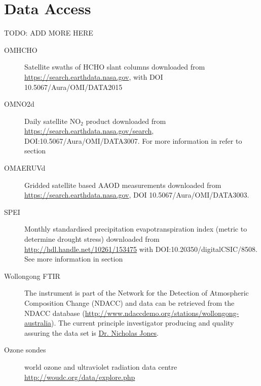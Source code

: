 \section{Data Access}
TODO: ADD MORE HERE
\label{Model:DataAccess}
\begin{description}
  \item[OMHCHO] Satellite swaths of HCHO slant columns downloaded from \url{https://search.earthdata.nasa.gov}, with DOI 10.5067/Aura/OMI/DATA2015
  
  \item[OMNO2d] Daily satellite NO$_2$ product downloaded from \url{https://search.earthdata.nasa.gov/search}, DOI:10.5067/Aura/OMI/DATA3007. 
  For more information in refer to section %
  
  \item[OMAERUVd] Gridded satellite based AAOD measurements downloaded from \url{https://search.earthdata.nasa.gov}, DOI 10.5067/Aura/OMI/DATA3003. %
  
  \item[SPEI] Monthly standardised precipitation evapotranspiration index (metric to determine drought stress) downloaded from \url{http://hdl.handle.net/10261/153475} with DOI:10.20350/digitalCSIC/8508.
  See more information in section %
  
  \item[Wollongong FTIR] The instrument is part of the Network for the Detection of Atmospheric Composition Change (NDACC) and data can be retrieved from the NDACC database (\url{http://www.ndaccdemo.org/stations/wollongong-australia}).
  The current principle investigator producing and quality assuring the data set is \href{mailto:njones@uow.edu.au}{Dr. Nicholas Jones}.
  
  \item[Ozone sondes] world ozone and ultraviolet radiation data centre \url{http://woudc.org/data/explore.php}
  
  
\end{description}